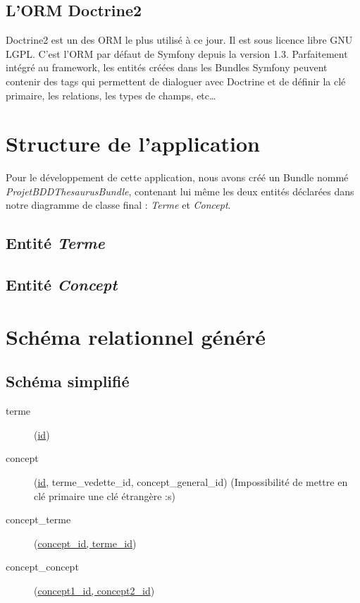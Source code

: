 \subsection{L'ORM Doctrine2}

Doctrine2 est un des ORM le plus utilisé à ce jour. Il est sous licence libre GNU LGPL. C'est l'ORM par défaut de Symfony depuis la version 1.3. Parfaitement intégré au framework, les entités créées dans les Bundles Symfony peuvent contenir des tags qui permettent de dialoguer avec Doctrine et de définir la clé primaire, les relations, les types de champs, etc\ldots

\section{Structure de l'application}

Pour le développement de cette application, nous avons créé un Bundle nommé \emph{ProjetBDDThesaurusBundle}, contenant lui même les deux entités déclarées dans notre diagramme de classe final : \emph{Terme} et \emph{Concept}.

\subsection{Entité \emph{Terme}}


\subsection{Entité \emph{Concept}}


\section{Schéma relationnel généré}

\subsection{Schéma simplifié}
\begin{description}
\item[terme](\underline{id})
\item[concept](\underline{id}, terme\_vedette\_id\up{\#}, concept\_general\_id\up{\#}) (Impossibilité de mettre en clé primaire une clé étrangère :s)
\item[concept\_terme](\underline{concept\_id\up{\#}, terme\_id\up{\#}})
\item[concept\_concept](\underline{concept1\_id\up{\#}, concept2\_id\up{\#}})
\end{description}

